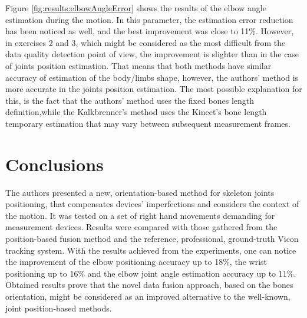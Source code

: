 \documentclass[sensors,article,submit,moreauthors,pdftex,10pt,a4paper]{mdpi}
\begin{document}
Figure \ref{fig:results:elbowAngleError} shows the results of the elbow angle estimation during the motion. In this parameter, the estimation error reduction has been noticed as well, and the best improvement was close to 11\%. However, in exercises 2 and 3, which might be considered as the most difficult from the data quality detection point of view, the improvement is slighter than in the case of joints position estimation. That means that both methods have similar accuracy of estimation of the body/limbs shape, however, the authors’ method is more accurate in the joints position estimation. The most possible explanation for this, is the fact that the authors’ method uses the fixed bones length definition,while the Kalkbrenner’s method uses the Kinect’s bone length temporary estimation that may vary between subsequent measurement frames.

\section{Conclusions}


The authors presented a new, orientation-based method for skeleton joints positioning, that compensates devices' imperfections and considers the context of the motion. It was tested on a set of right hand movements demanding for measurement devices. Results were compared with those gathered from the position-based fusion method and the reference, professional, ground-truth Vicon tracking system. With the results achieved from the experiments, one can notice the improvement of the elbow positioning accuracy up to 18\%, the wrist positioning up to 16\% and the elbow joint angle estimation accuracy up to 11\%.
Obtained results prove that the novel data fusion approach, based on the bones orientation, might be considered as an improved alternative to the well-known, joint position-based methods.


\vspace{6pt} 


\end{document}
